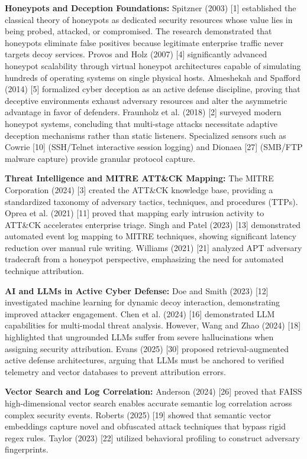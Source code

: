 \documentclass[12pt,a4paper]{report}
\begin{document}
\textbf{Honeypots and Deception Foundations:} Spitzner (2003) [1] established the classical theory of honeypots as dedicated security resources whose value lies in being probed, attacked, or compromised. The research demonstrated that honeypots eliminate false positives because legitimate enterprise traffic never targets decoy services. Provos and Holz (2007) [4] significantly advanced honeypot scalability through virtual honeypot architectures capable of simulating hundreds of operating systems on single physical hosts. Almeshekah and Spafford (2014) [5] formalized cyber deception as an active defense discipline, proving that deceptive environments exhaust adversary resources and alter the asymmetric advantage in favor of defenders. Fraunholz et al. (2018) [2] surveyed modern honeypot systems, concluding that multi-stage attacks necessitate adaptive deception mechanisms rather than static listeners. Specialized sensors such as Cowrie [10] (SSH/Telnet interactive session logging) and Dionaea [27] (SMB/FTP malware capture) provide granular protocol capture.

\textbf{Threat Intelligence and MITRE ATT\&CK Mapping:} The MITRE Corporation (2024) [3] created the ATT\&CK knowledge base, providing a standardized taxonomy of adversary tactics, techniques, and procedures (TTPs). Oprea et al. (2021) [11] proved that mapping early intrusion activity to ATT\&CK accelerates enterprise triage. Singh and Patel (2023) [13] demonstrated automated event log mapping to MITRE techniques, showing significant latency reduction over manual rule writing. Williams (2021) [21] analyzed APT adversary tradecraft from a honeypot perspective, emphasizing the need for automated technique attribution.

\textbf{AI and LLMs in Active Cyber Defense:} Doe and Smith (2023) [12] investigated machine learning for dynamic decoy interaction, demonstrating improved attacker engagement. Chen et al. (2024) [16] demonstrated LLM capabilities for multi-modal threat analysis. However, Wang and Zhao (2024) [18] highlighted that ungrounded LLMs suffer from severe hallucinations when assigning security attribution. Evans (2025) [30] proposed retrieval-augmented active defense architectures, arguing that LLMs must be anchored to verified telemetry and vector databases to prevent attribution errors.

\textbf{Vector Search and Log Correlation:} Anderson (2024) [26] proved that FAISS high-dimensional vector search enables accurate semantic log correlation across complex security events. Roberts (2025) [19] showed that semantic vector embeddings capture novel and obfuscated attack techniques that bypass rigid regex rules. Taylor (2023) [22] utilized behavioral profiling to construct adversary fingerprints.
\end{document}
